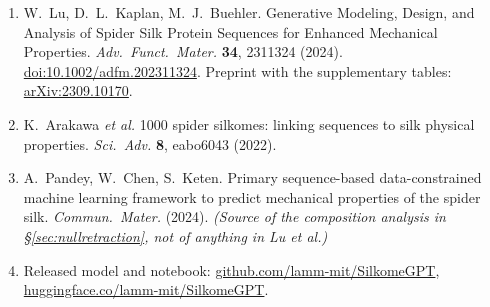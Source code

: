 \begin{enumerate}[leftmargin=*,itemsep=2pt]
\item W.~Lu, D.~L.~Kaplan, M.~J.~Buehler. Generative Modeling, Design, and
  Analysis of Spider Silk Protein Sequences for Enhanced Mechanical Properties.
  \emph{Adv.\ Funct.\ Mater.} \textbf{34}, 2311324 (2024).
  \href{https://doi.org/10.1002/adfm.202311324}{doi:10.1002/adfm.202311324}.
  Preprint with the supplementary tables:
  \href{https://arxiv.org/abs/2309.10170}{arXiv:2309.10170}.
\item K.~Arakawa \emph{et al.} 1000 spider silkomes: linking sequences to silk
  physical properties. \emph{Sci.\ Adv.} \textbf{8}, eabo6043 (2022).
\item A.~Pandey, W.~Chen, S.~Keten. Primary sequence-based data-constrained
  machine learning framework to predict mechanical properties of the spider
  silk. \emph{Commun.\ Mater.} (2024). \emph{(Source of the composition
  analysis in §\ref{sec:nullretraction}, not of anything in Lu et al.)}
\item Released model and notebook:
  \href{https://github.com/lamm-mit/SilkomeGPT}{github.com/lamm-mit/SilkomeGPT},
  \href{https://huggingface.co/lamm-mit/SilkomeGPT}{huggingface.co/lamm-mit/SilkomeGPT}.
\end{enumerate}
